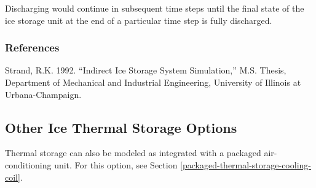 Discharging would continue in subsequent time steps until the final state of the ice storage unit at the end of a particular time step is fully discharged.

\subsubsection{References}\label{references-1-011}

Strand, R.K. 1992. ``Indirect Ice Storage System Simulation,'' M.S. Thesis, Department of Mechanical and Industrial Engineering, University of Illinois at Urbana-Champaign.

\subsection{Other Ice Thermal Storage Options}

Thermal storage can also be modeled as integrated with a packaged air-conditioning unit. For this option, see Section \ref{packaged-thermal-storage-cooling-coil}.

